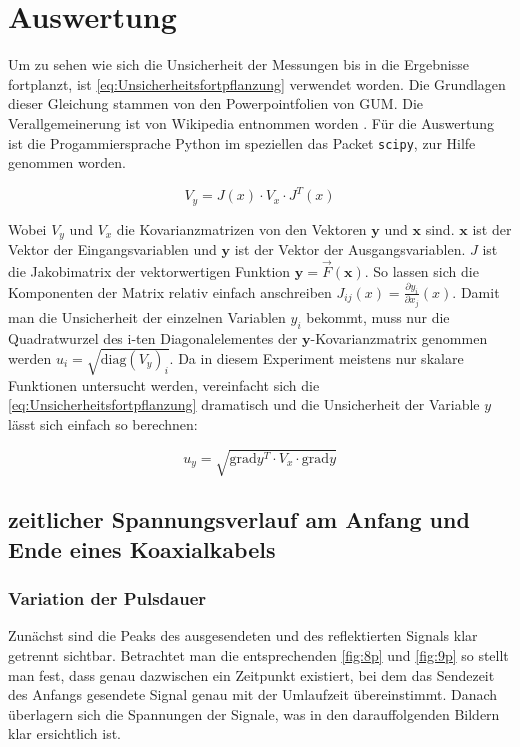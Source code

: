\documentclass[11pt,ngerman]{scrartcl}
\begin{document}
\section{Auswertung}

\noindent Um zu sehen wie sich die Unsicherheit der Messungen bis in die Ergebnisse
fortplanzt, ist \autoref{eq:Unsicherheitsfortpflanzung} verwendet worden.
Die Grundlagen dieser Gleichung stammen von den Powerpointfolien von
GUM.\cite{WolfgangKessel2004} Die Verallgemeinerung ist von Wikipedia entnommen
worden \cite{2020Fehler}.
Für die Auswertung ist die Progammiersprache Python im speziellen das
Packet \verb#scipy#, zur Hilfe genommen worden.

\begin{equation}
	\label{eq:Unsicherheitsfortpflanzung}
	V_y = J(x) \cdot V_x \cdot J^{T}(x)
\end{equation}

\noindent Wobei $V_y$ und $V_x$ die Kovarianzmatrizen von den Vektoren $\bm{y}$ und $\bm{x}$ sind.
$\bm{x}$ ist der Vektor der Eingangsvariablen und $\bm{y}$ ist der Vektor der Ausgangsvariablen.
$J$ ist die Jakobimatrix der vektorwertigen Funktion $\bm{y} = \vec{F}(\bm{x})$.
So lassen sich die Komponenten der Matrix relativ einfach anschreiben $J_{ij}(x) = \frac{\partial{y_i}}{\partial{x_j}}(x)$.
Damit man die Unsicherheit der einzelnen Variablen $y_i$ bekommt, muss nur die Quadratwurzel des i-ten Diagonalelementes der
$\bm{y}$-Kovarianzmatrix genommen werden $u_i= \sqrt{\mathrm{diag}(V_y)_i}$.
Da in diesem Experiment meistens nur skalare Funktionen untersucht werden, vereinfacht
sich die \autoref{eq:Unsicherheitsfortpflanzung} dramatisch und die Unsicherheit
der Variable $y$ lässt sich einfach so berechnen:

\begin{equation}
	\label{eq:graduncentainty}
	u_y = \sqrt{\mathrm{grad} y^T \cdot V_x \cdot \mathrm{grad} y}
\end{equation}


\subsection{zeitlicher Spannungsverlauf am Anfang und Ende eines Koaxialkabels}


\subsubsection{Variation der Pulsdauer}

Zunächst sind die Peaks des ausgesendeten und des reflektierten Signals klar getrennt sichtbar.
Betrachtet man die entsprechenden \autoref{fig:8p} und \autoref{fig:9p} so stellt man fest, dass genau dazwischen ein Zeitpunkt existiert, bei dem das Sendezeit des Anfangs gesendete Signal genau mit der Umlaufzeit übereinstimmt.
Danach  überlagern sich die Spannungen der Signale, was in den darauffolgenden Bildern klar ersichtlich ist.
\end{document}
